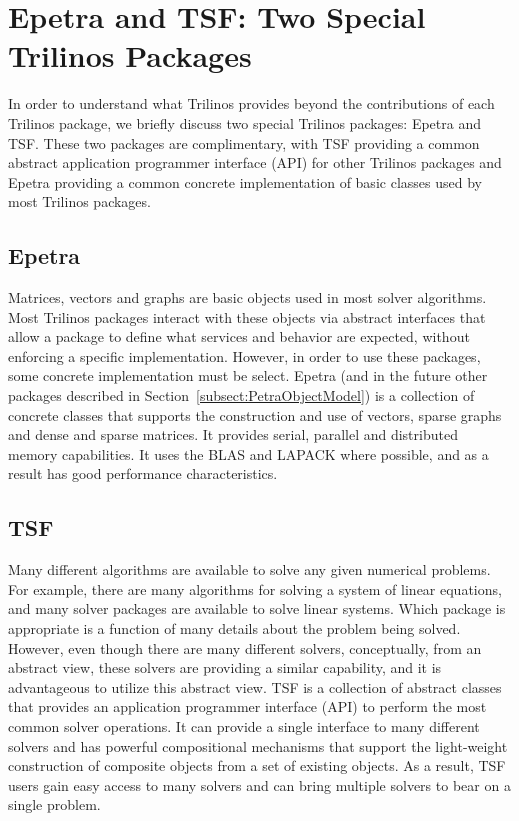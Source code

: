 \documentclass[12pt,strict]{SANDreport}
\begin{document}
\section{Epetra and TSF: Two Special Trilinos Packages}
\label{sect:EpetraAndTSF}
In order to understand what Trilinos provides beyond the
contributions of each Trilinos package, we briefly discuss two special
Trilinos packages: Epetra and TSF.  These two packages are complimentary,
with TSF providing a common abstract application
programmer interface (API) for other Trilinos packages and Epetra
providing a common concrete implementation of basic classes used by most
Trilinos packages.

\subsection{Epetra}
Matrices, vectors and graphs are basic objects used in most solver
algorithms. Most Trilinos
packages interact with these objects via abstract interfaces that
allow a package to define what services and behavior are expected,
without enforcing a specific implementation.  However, in order to use
these packages, some concrete
implementation must be select.  Epetra (and in the future other packages described
in Section~\ref{subsect:PetraObjectModel}) is a collection of concrete
classes that supports the construction and use of vectors, sparse
graphs and dense and sparse matrices.  It provides serial, parallel and distributed memory
capabilities.  It uses the BLAS and LAPACK where possible, and as a
result has good performance characteristics.

\subsection{TSF}
Many different algorithms are available to solve any given numerical
problems.  For example, there are many algorithms for solving a system
of linear equations, and many solver packages are available to solve
linear systems.  Which package is appropriate is a function of
many details about the problem being solved. However, even though
there are many different solvers, conceptually, from an abstract view,
these solvers are providing a similar capability, and it is
advantageous to utilize this abstract view.
TSF is a collection of abstract classes that provides an application
programmer interface (API) to perform the most common solver
operations.  It can provide a single interface to many different
solvers and has powerful compositional mechanisms that support the
light-weight construction of composite objects from a set of
existing objects.  As a result, TSF users gain easy access to many
solvers and can bring multiple solvers to bear on a single problem.
\end{document}
